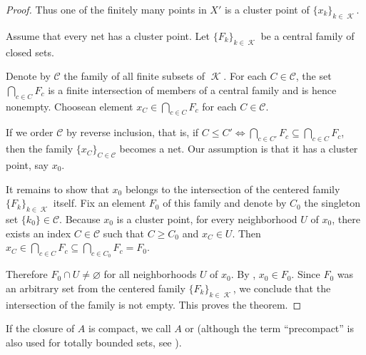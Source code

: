 \begin{proof}
  Thus one of the finitely many points in \( X' \) is a cluster point of \( \{ x_k \}_{k \in \mscrK} \).

  \mcite\cite[thm. 3.1.23]{Engelking1989} Assume that every net has a cluster point. Let \( \{ F_k \}_{k \in \mscrK} \) be a central family of closed sets.

  Denote by \( \mathcal C \) the family of all finite subsets of \( \mscrK \). For each \( C \in \mathcal C \), the set \( \bigcap_{c \in C} F_c \) is a finite intersection of members of a central family and is hence nonempty. Choose\AOC an element \( x_C \in \bigcap_{c \in C} F_c \) for each \( C \in \mathcal C \).

  If we order \( \mathcal C \) by reverse inclusion, that is, if \( C \leq C' \iff \bigcap_{c \in C'} F_c \subseteq \bigcap_{c \in C} F_c \), then the family \( \{ x_C \}_{C \in \mathcal C} \) becomes a net. Our assumption is that it has a cluster point, say \( x_0 \).

  It remains to show that \( x_0 \) belongs to the intersection of the centered family \( \{ F_k \}_{k \in \mscrK} \) itself. Fix an element \( F_0 \) of this family and denote by \( C_0 \) the singleton set \( \{ k_0 \} \in \mathcal C \). Because \( x_0 \) is a cluster point, for every neighborhood \( U \) of \( x_0 \), there exists an index \( C \in \mathcal C \) such that \( C \geq C_0 \) and \( x_C \in U \). Then \( x_C \in \bigcap_{c \in C} F_c \subseteq \bigcap_{c \in C_0} F_c = F_0 \).

  Therefore \( F_0 \cap U \neq \varnothing \) for all neighborhoods \( U \) of \( x_0 \). By , \( x_0 \in F_0 \). Since \( F_0 \) was an arbitrary set from the centered family \( \{ F_k \}_{k \in \mscrK} \), we conclude that the intersection of the family is not empty. This proves the theorem.
\end{proof}

\begin{remark}\label{rem:precompact_set}
  If the closure of \( A \) is compact, we call \( A \)  or  (although the term \enquote{precompact} is also used for totally bounded sets, see ).
\end{remark}

